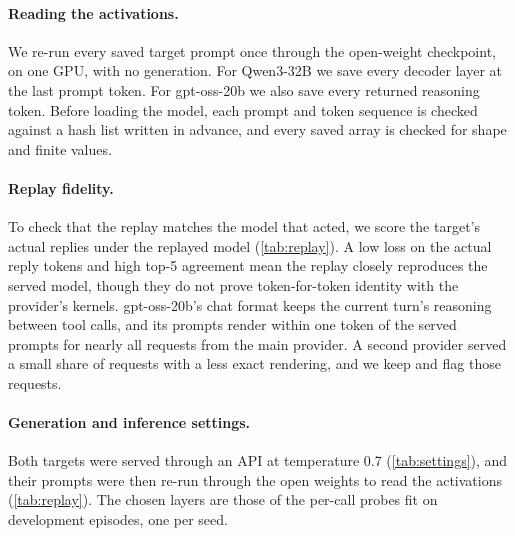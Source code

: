 \paragraph{Reading the activations.}
We re-run every saved target prompt once through the open-weight checkpoint, on one GPU, with no generation.
For Qwen3-32B we save every decoder layer at the last prompt token.
For gpt-oss-20b we also save every returned reasoning token.
Before loading the model, each prompt and token sequence is checked against a hash list written in advance, and every saved array is checked for shape and finite values.

\paragraph{Replay fidelity.}
To check that the replay matches the model that acted, we score the target's actual replies under the replayed model (\cref{tab:replay}).
A low loss on the actual reply tokens and high top-5 agreement mean the replay closely reproduces the served model, though they do not prove token-for-token identity with the provider's kernels.
gpt-oss-20b's chat format keeps the current turn's reasoning between tool calls, and its prompts render within one token of the served prompts for nearly all requests from the main provider.
A second provider served a small share of requests with a less exact rendering, and we keep and flag those requests.

\begin{table}[h]
  \centering
  \small
  
  \caption{Replay fidelity: loss of the actual reply tokens under the replayed model, and top-5 token agreement.}
  \label{tab:replay}
\end{table}

\paragraph{Generation and inference settings.}
Both targets were served through an API at temperature 0.7 (\cref{tab:settings}), and their prompts were then re-run through the open weights to read the activations (\cref{tab:replay}).
The chosen layers are those of the per-call probes fit on development episodes, one per seed.

\begin{table}[h]
  \centering
  \small
  
  \caption{Generation and inference settings.}
  \label{tab:settings}
\end{table}

